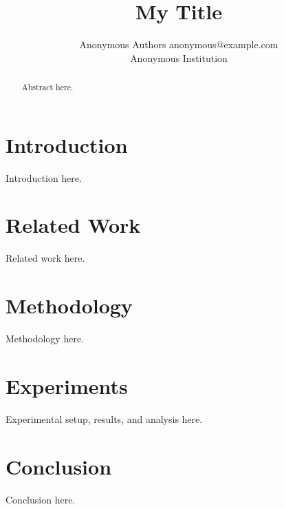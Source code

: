 \documentclass[10pt]{article} %
\title{My Title}
\author{\name Anonymous Authors \email anonymous@example.com \\
      \addr Anonymous Institution}
\begin{document}
\maketitle

\begin{abstract}
Abstract here.
\end{abstract}

\section{Introduction}
\label{sec:intro}
Introduction here.

\section{Related Work}
\label{sec:related_work}
Related work here.

\section{Methodology}
\label{sec:method}
Methodology here.

\section{Experiments}
\label{sec:experiments}
Experimental setup, results, and analysis here.

\section{Conclusion}
\label{sec:conclusion}
Conclusion here.




\end{document}
